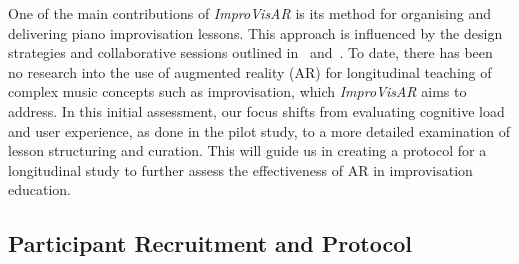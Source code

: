 \documentclass{vgtc}                          %
\begin{document}
\par %
One of the main contributions of \textit{ImproVisAR} is its method for organising and delivering piano improvisation lessons. This approach is influenced by the design strategies and collaborative sessions outlined in~\cite{deja2022piano} and~\cite{deja2024teach}. To date, there has been no research into the use of augmented reality (AR) for longitudinal teaching of complex music concepts such as improvisation, which \textit{ImproVisAR} aims to address. In this initial assessment, our focus shifts from evaluating cognitive load and user experience, as done in the pilot study, to a more detailed examination of lesson structuring and curation. This will guide us in creating a protocol for a longitudinal study to further assess the effectiveness of AR in improvisation education.

\subsection{Participant Recruitment and Protocol}
\end{document}
